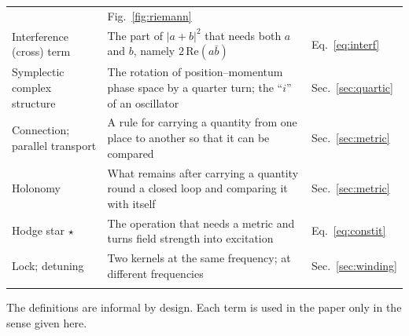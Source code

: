 \documentclass[%
 reprint, amsmath,amssymb, aps, prb, ]{revtex4-2}
\numberwithin{equation}{section}
\newcommand{\hodge}{\star}
\begin{document}
\begin{table}[t!]
\begin{tabular}{p{3.2cm}p{8.6cm}p{3.8cm}}
& Fig.~\ref{fig:riemann} \\
\addlinespace[0.3cm]
Interference (cross) term
& The part of $|a+b|^2$ that needs both $a$ and $b$, namely $2\,\mathrm{Re}(a\bar b)$
& Eq.~\eqref{eq:interf} \\
\addlinespace[0.3cm]
Symplectic complex structure
& The rotation of position--momentum phase space by a quarter turn; the ``$i$'' of an oscillator
& Sec.~\ref{sec:quartic} \\
\addlinespace[0.3cm]
Connection; parallel transport
& A rule for carrying a quantity from one place to another so that it can be compared
& Sec.~\ref{sec:metric} \\
\addlinespace[0.3cm]
Holonomy
& What remains after carrying a quantity round a closed loop and comparing it with itself
& Sec.~\ref{sec:metric} \\
\addlinespace[0.3cm]
Hodge star $\hodge$
& The operation that needs a metric and turns field strength into excitation
& Eq.~\eqref{eq:constit} \\
\addlinespace[0.3cm]
Lock; detuning
& Two kernels at the same frequency; at different frequencies
& Sec.~\ref{sec:winding} \\
\addlinespace[0.2cm]
\bottomrule
\end{tabular}
\vspace{0.2cm}
\begin{minipage}{0.95\textwidth}
\justifying\footnotesize
The definitions are informal by design. Each term is used in the paper only in the sense given here.
\end{minipage}
\end{table}
\end{document}
